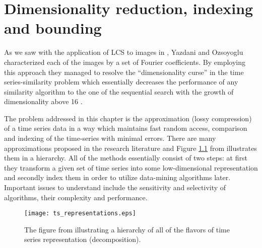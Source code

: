 \chapter{Dimensionality reduction, indexing and bounding}
As we saw with the application of LCS to images in \cite{citeulike:4367061}, Yazdani and Ozsoyoglu characterized each of the images by a set of Fourier coefficients. By employing this approach they managed to resolve the ``dimensionality curse'' in the time series-similarity problem which essentially decreases the performance of any similarity algorithm to the one of the sequential search with the growth of dimensionality above 16 \cite{citeulike:4408223} \cite{citeulike:4384496} \cite{citeulike:2843857} \cite{citeulike:4384489} \cite{citeulike:343069}.

The problem addressed in this chapter is the approximation (lossy compression) of a time series data in a way which maintains fast random access, comparison and indexing of the time-series with minimal errors. There are many approximations proposed in the research literature and Figure \ref{fig:approximations} from \cite{citeulike:2821475} illustrates them in a hierarchy. All of the methods essentially consist of two steps: at first they transform a given set of time series into some low-dimensional representation and secondly index them in order to utilize data-mining algorithms later. Important issues to understand include the sensitivity and selectivity of algorithms, their complexity and performance.

\begin{figure}[tbp]
   \centering
   \texttt{[image: ts\_representations.eps]}
   \caption{The figure from \cite{citeulike:2821475} illustrating a hierarchy of all of the flavors of time series representation (decomposition).}
   \label{fig:approximations}
\end{figure} 
